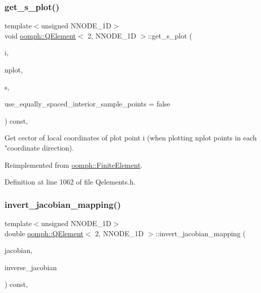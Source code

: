 \subsubsection{\texorpdfstring{get\+\_\+s\+\_\+plot()}{get\_s\_plot()}}
{\footnotesize\ttfamily template$<$unsigned N\+N\+O\+D\+E\+\_\+1D$>$ \\
void \hyperlink{classoomph_1_1QElement}{oomph\+::\+Q\+Element}$<$ 2, N\+N\+O\+D\+E\+\_\+1D $>$\+::get\+\_\+s\+\_\+plot (\begin{DoxyParamCaption}\item[{const unsigned \&}]{i,  }\item[{const unsigned \&}]{nplot,  }\item[{\hyperlink{classoomph_1_1Vector}{Vector}$<$ double $>$ \&}]{s,  }\item[{const bool \&}]{use\+\_\+equally\+\_\+spaced\+\_\+interior\+\_\+sample\+\_\+points = {\ttfamily false} }\end{DoxyParamCaption}) const\hspace{0.3cm}{\ttfamily [inline]}, {\ttfamily [virtual]}}



Get cector of local coordinates of plot point i (when plotting nplot points in each "coordinate direction). 



Reimplemented from \hyperlink{classoomph_1_1FiniteElement_a82da844fd3ebb2005842464cdc148a03}{oomph\+::\+Finite\+Element}.



Definition at line 1062 of file Qelements.\+h.

\mbox{\label{classoomph_1_1QElement_3_012_00_01NNODE__1D_01_4_a535ca15e3fca609458bd51347e86e9a5}} 
\subsubsection{\texorpdfstring{invert\+\_\+jacobian\+\_\+mapping()}{invert\_jacobian\_mapping()}}
{\footnotesize\ttfamily template$<$unsigned N\+N\+O\+D\+E\+\_\+1D$>$ \\
double \hyperlink{classoomph_1_1QElement}{oomph\+::\+Q\+Element}$<$ 2, N\+N\+O\+D\+E\+\_\+1D $>$\+::invert\+\_\+jacobian\+\_\+mapping (\begin{DoxyParamCaption}\item[{const \hyperlink{classoomph_1_1DenseMatrix}{Dense\+Matrix}$<$ double $>$ \&}]{jacobian,  }\item[{\hyperlink{classoomph_1_1DenseMatrix}{Dense\+Matrix}$<$ double $>$ \&}]{inverse\+\_\+jacobian }\end{DoxyParamCaption}) const\hspace{0.3cm}{\ttfamily [inline]}, {\ttfamily [virtual]}}



